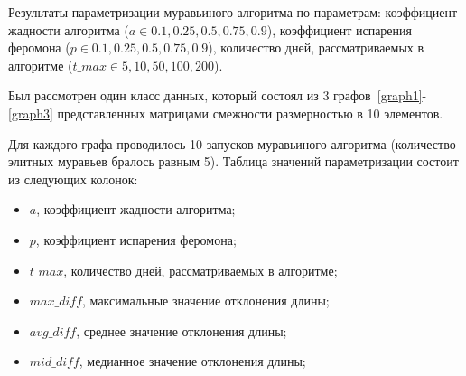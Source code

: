 
Результаты параметризации муравьиного алгоритма по параметрам:  коэффициент жадности алгоритма ($a \in {0.1, 0.25, 0.5, 0.75, 0.9}$), коэффициент испарения феромона ($p \in {0.1, 0.25, 0.5, 0.75, 0.9}$), количество дней, рассматриваемых в алгоритме ($t\_max \in {5, 10, 50, 100, 200}$).

Был рассмотрен один класс данных, который состоял из 3 графов~\ref{graph1}-\ref{graph3} представленных матрицами смежности размерностью в 10 элементов. 

Для каждого графа проводилось 10 запусков муравьиного алгоритма (количество элитных муравьев бралось равным 5). Таблица значений параметризации состоит из следующих колонок:
\begin{itemize}
	\item $a$, коэффициент жадности алгоритма;
	\item $p$, коэффициент испарения феромона;
	\item $t\_max$, количество дней, рассматриваемых в алгоритме;
	\item $max\_diff$, максимальные значение отклонения длины;
	\item $avg\_diff$, среднее значение отклонения длины;
	\item $mid\_diff $, медианное значение отклонения длины;
\end{itemize}

